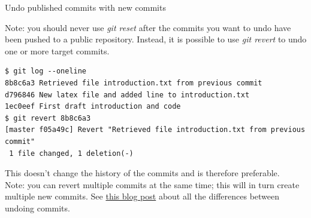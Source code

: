 \documentclass[10pt]{beamer}
\begin{document}
\begin{frame}[fragile]{Undo published commits with new commits}

Note: you should never use \textit{git reset} after the commits you want to undo have been pushed to a public repository. Instead, it is possible to use \textit{git revert} to undo one or more target commits.

\begin{lstlisting}
$ git log --oneline
8b8c6a3	Retrieved file introduction.txt from previous commit
d796846	New latex file and added line to introduction.txt
1ec0eef	First draft introduction and code
$ git revert 8b8c6a3
[master f05a49c] Revert "Retrieved file introduction.txt from previous commit"
 1 file changed, 1 deletion(-)
\end{lstlisting}

This doesn't change the history of the commits and is therefore preferable.\\
\medskip
Note: you can revert multiple commits at the same time; this will in turn create multiple new commits.
See \href{https://github.com/blog/2019-how-to-undo-almost-anything-with-git}{this blog post} about all the differences between undoing commits.


\end{frame}
\end{document}
